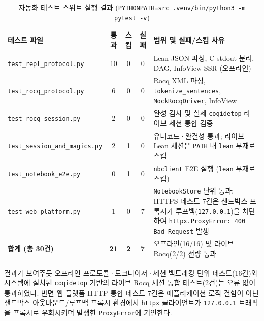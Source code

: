 \documentclass[journal]{IEEEtran}
\newcommand{\code}[1]{\texttt{#1}}
\begin{document}
\begin{table}[!t]
\caption{자동화 테스트 스위트 실행 결과 (\code{PYTHONPATH=src .venv/bin/python3 -m \mbox{pytest -v}})}
\label{tab:test_results}
\centering
\scriptsize
\begin{tabularx}{\columnwidth}{@{}l@{\hspace{5pt}} c@{\hspace{4pt}} c@{\hspace{4pt}} c@{\hspace{6pt}} X@{}}
\toprule
\textbf{테스트 파일} & \textbf{통과} & \textbf{스킵} & \textbf{실패} & \textbf{범위 및 실패/스킵 사유} \\
\midrule
\code{test\_repl\_protocol.py} & 10 & 0 & 0 & Lean JSON 파싱, C stdout 분리, DAG, InfoView SSR (오프라인) \\
\code{test\_rocq\_protocol.py} & 6 & 0 & 0 & Rocq XML 파싱, \code{tokenize\_sentences}, \code{MockRocqDriver}, InfoView \\
\code{test\_rocq\_session.py} & 2 & 0 & 0 & 완성 검사 및 실제 \code{coqidetop} 라이브 세션 통합 검증 \\
\code{test\_session\_and\_magics.py} & 2 & 1 & 0 & 유니코드·완결성 통과; 라이브 Lean 세션은 \code{PATH} 내 \code{lean} 부재로 스킵 \\
\code{test\_notebook\_e2e.py} & 0 & 1 & 0 & \code{nbclient} E2E 실행 (\code{lean} 부재로 스킵) \\
\code{test\_web\_platform.py} & 1 & 0 & 7 & \code{NotebookStore} 단위 통과; HTTPS 테스트 7건은 샌드박스 프록시가 루프백(\code{127.0.0.1})을 차단하여 \code{httpx.ProxyError: 400 Bad Request} 발생 \\
\midrule
\textbf{합계 (총 30건)} & \textbf{21} & \textbf{2} & \textbf{7} & 오프라인(16/16) 및 라이브 Rocq(2/2) 전량 통과 \\
\bottomrule
\end{tabularx}
\end{table}

결과가 보여주듯 오프라인 프로토콜·토크나이저·세션 백트래킹 단위 테스트(16건)와 시스템에 설치된 \code{coqidetop} 기반의 라이브 Rocq 세션 통합 테스트(2건)는 오류 없이 통과하였다. 반면 웹 플랫폼 HTTP 통합 테스트 7건은 애플리케이션 로직 결함이 아닌 샌드박스 아웃바운드/루프백 프록시 환경에서 \code{httpx} 클라이언트가 \code{127.0.0.1} 트래픽을 프록시로 우회시키며 발생한 \code{ProxyError}에 기인한다.
\end{document}
